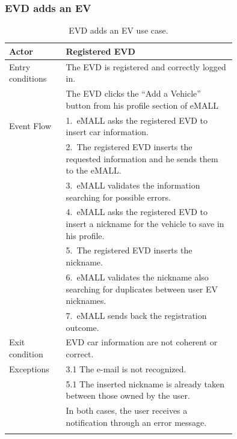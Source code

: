 \subsubsection*{EVD adds an EV}
\begin{center}
    \begin{longtable}{lp{0.75\linewidth}}
        \hline
        Actor            & Registered EVD                                                                                 \\
        \hline
        Entry conditions & The EVD is registered and correctly logged in.                                                 \\
        & The EVD clicks the ``Add a Vehicle'' button from his profile section of eMALL                  \\
        \hline
        Event Flow       & 1.\ eMALL asks the registered EVD to insert car information.                                   \\
        & 2.\ The registered EVD inserts the requested information and he sends them to the eMALL.       \\
        & 3.\ eMALL validates the information searching for possible errors.                             \\
        & 4.\ eMALL asks the registered EVD to insert a nickname for the vehicle to save in his profile. \\
        & 5.\ The registered EVD inserts the nickname.                                                   \\
        & 6.\ eMALL validates the nickname also searching for duplicates between user EV nicknames.      \\
        & 7.\ eMALL sends back the registration outcome.                                                 \\
        \hline
        Exit condition   & EVD car information are not coherent or correct.                                               \\
        \hline
        Exceptions       & 3.1 The e-mail is not recognized.                                                              \\
        & 5.1 The inserted nickname is already taken between those owned by the user.                    \\
        & In both cases, the user receives a notification through an error message.                      \\
        \hline
        \caption{EVD adds an EV use case.}
        \label{tab: EVD_adds_a_vehicle_use_case}
    \end{longtable}
\end{center}

